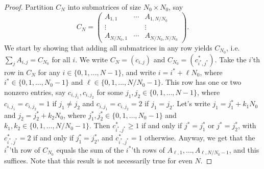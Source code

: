 \documentclass[10pt]{article}
\theoremstyle{definition}
\begin{document}
\begin{proof}
    Partition $ C_N $ into submatrices of size $ N_0 \times N_0 $, say
    \[ C_N = \begin{pmatrix} A_{1,1}     & \cdots & A_{1,N/N_0}     \\
        \vdots      &        & \vdots          \\
        A_{N/N_0,1} & \cdots & A_{N/N_0,N/N_0} \end{pmatrix} . \]
    We start by showing that adding all submatrices in any row yields $ C_{N_0} $, i.e.\
    $ \sum_j A_{i,j} = C_{N_0} $ for all $ i $.
    We write $ C_N = (c_{i,j}) $ and $ C_{N_0} = (c_{i^{\ast},j^{\ast}}^{\ast}) $. Take the $ i $'th row in
    $ C_N $ for any $ i \in \{ 0, 1, \ldots, N-1 \} $, and write $ i = i^{\ast} + \ell N_0 $, where
    $ i^{\ast} \in \{ 0, 1, \ldots, N_0-1 \} $ and $ \ell \in \{ 0, 1, \ldots, N/N_0-1 \} $. This row has one
    or two nonzero entries, say $ c_{i,j_1}, c_{i,j_2} $ for some $ j_1, j_2 \in \{ 0, 1, \ldots, N-1 \} $,
    where $ c_{i,j_1} = c_{i,j_2} = 1 $ if $ j_1 \neq j_2 $ and $ c_{i,j_1} = c_{i,j_2} = 2 $ if
    $ j_1 = j_2 $. Let's write $ j_1 = j_1^{\ast} + k_1 N_0 $ and $ j_2 = j_2^{\ast} + k_2 N_0 $, where
    $ j_1^{\ast}, j_2^{\ast} \in \{ 0, 1, \ldots, N_0-1 \} $ and
    $ k_1, k_2 \in \{ 0, 1, \ldots, N/N_0-1 \} $. Then $ c_{i^{\ast},j^{\ast}}^{\ast} \geq 1 $ if and only if
    $ j^{\ast} = j_1^{\ast} $ or $ j^{\ast} = j_2^{\ast} $, with $ c_{i^{\ast},j^{\ast}}^{\ast} = 2 $ if and
    only if $ j_1^{\ast} = j_2^{\ast} $, and $ c_{i^{\ast},j^{\ast}}^{\ast} = 1 $ otherwise. Anyway, we get
    that the $ i^{\ast} $'th row of $ C_{N_0} $ equals the sum of the $ i^{\ast} $'th rows of
    $ A_{\ell,1}, \ldots, A_{\ell,N/N_0-1} $, and this suffices. Note that this result is not necessarily
    true for even $ N $.


\end{proof}
\end{document}
